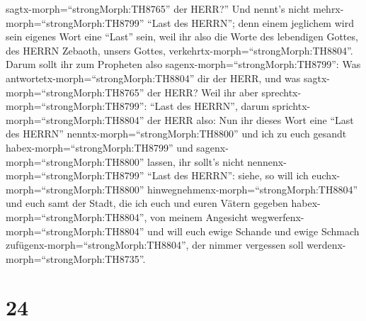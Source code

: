 sagtx-morph=``strongMorph:TH8765'' der HERR?''  Und nennt's
nicht mehrx-morph=``strongMorph:TH8799'' ``Last des HERRN''; denn einem
jeglichem wird sein eigenes Wort eine ``Last'' sein, weil ihr also die
Worte des lebendigen Gottes, des HERRN Zebaoth, unsers Gottes,
verkehrtx-morph=``strongMorph:TH8804''.  Darum sollt ihr
zum Propheten also sagenx-morph=``strongMorph:TH8799'': Was
antwortetx-morph=``strongMorph:TH8804'' dir der HERR, und was
sagtx-morph=``strongMorph:TH8765'' der HERR?  Weil ihr aber
sprechtx-morph=``strongMorph:TH8799'': ``Last des HERRN'', darum
sprichtx-morph=``strongMorph:TH8804'' der HERR also: Nun ihr dieses Wort
eine ``Last des HERRN'' nenntx-morph=``strongMorph:TH8800'' und ich zu
euch gesandt habex-morph=``strongMorph:TH8799'' und
sagenx-morph=``strongMorph:TH8800'' lassen, ihr sollt's nicht
nennenx-morph=``strongMorph:TH8799'' ``Last des HERRN'': 
siehe, so will ich euchx-morph=``strongMorph:TH8800''
hinwegnehmenx-morph=``strongMorph:TH8804'' und euch samt der Stadt, die
ich euch und euren Vätern gegeben habex-morph=``strongMorph:TH8804'',
von meinem Angesicht wegwerfenx-morph=``strongMorph:TH8804''
 und will euch ewige Schande und ewige Schmach
zufügenx-morph=``strongMorph:TH8804'', der nimmer vergessen soll
werdenx-morph=``strongMorph:TH8735''.

\hypertarget{section-23}{%
\section{24}\label{section-23}}

